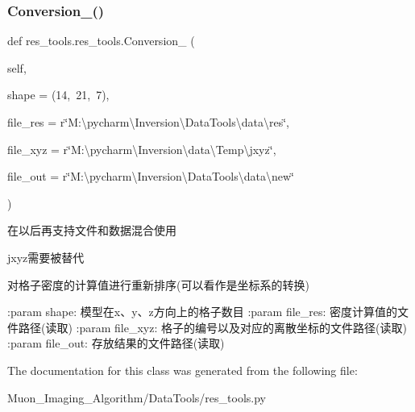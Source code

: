 \subsubsection{\texorpdfstring{Conversion\+\_()}{Conversion\_2()}}
{\footnotesize\ttfamily def res\+\_\+tools.\+res\+\_\+tools.\+Conversion\+\_ (\begin{DoxyParamCaption}\item[{}]{self,  }\item[{}]{shape = {\ttfamily (14,~21,~7)},  }\item[{}]{file\+\_\+res = {\ttfamily r\char`\"{}M\+:\textbackslash{}pycharm\textbackslash{}Inversion\textbackslash{}DataTools\textbackslash{}data\textbackslash{}res\char`\"{}},  }\item[{}]{file\+\_\+xyz = {\ttfamily r\char`\"{}M\+:\textbackslash{}pycharm\textbackslash{}Inversion\textbackslash{}data\textbackslash{}Temp\textbackslash{}jxyz\char`\"{}},  }\item[{}]{file\+\_\+out = {\ttfamily r\char`\"{}M\+:\textbackslash{}pycharm\textbackslash{}Inversion\textbackslash{}DataTools\textbackslash{}data\textbackslash{}new\char`\"{}} }\end{DoxyParamCaption})}

\begin{DoxyVerb}在以后再支持文件和数据混合使用

jxyz需要被替代

对格子密度的计算值进行重新排序(可以看作是坐标系的转换)

:param shape: 模型在x、y、z方向上的格子数目
:param file_res: 密度计算值的文件路径(读取)
:param file_xyz: 格子的编号以及对应的离散坐标的文件路径(读取)
:param file_out: 存放结果的文件路径(读取)
\end{DoxyVerb}
 

The documentation for this class was generated from the following file\+:\begin{DoxyCompactItemize}
\item 
Muon\+\_\+\+Imaging\+\_\+\+Algorithm/\+Data\+Tools/res\+\_\+tools.\+py\end{DoxyCompactItemize}
